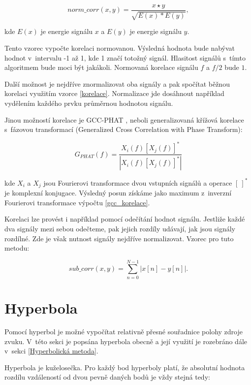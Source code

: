 \begin{equation}
norm\_corr(x,y)=\frac{x \star y}{\sqrt{E(x) * E(y)}},
	\label{norm_korelace_energie}
\end{equation}

kde $E(x)$ je energie signálu $x$ a $E(y)$ je energie signálu $y$.

Tento vzorec vypočte korelaci normovanou. Výsledná hodnota bude nabývat hodnot v~intervalu -1 až 1, kde 1 značí totožný signál. Hlasitost signálů s~tímto algoritmem bude moci být jakákoli. Normovaná korelace signálu $f$ a $f/2$ bude $1$.

Další možnost je nejdříve znormalizovat oba signály a pak spočítat běžnou korelaci využitím vzorce \ref{korelace}. Normalizace jde dosáhnout například vydělením každého prvku průměrnou hodnotou signálu.

Jinou možností korelace je GCC-PHAT \cite{gcc}, neboli generalizovaná křížová korelace s~fázovou transformací (Generalized Cross Correlation with Phase Transform):

\begin{equation}
G_{PHAT}(f)=\frac{X_i(f)[X_j(f)]^*}{|X_i(f)[X_j(f)]^*|}
	\label{gcc_korelace}
\end{equation}

kde $X_i$ a $X_j$ jsou Fourierovi transformace dvou vstupních signálů a operace $[\ ]^*$ je komplexní konjugace. Výsledný posun získáme jako maximum z~inverzní Fourierovi transformace výpočtu \ref{gcc_korelace}.

Korelaci lze provést i například pomocí odečítání hodnot signálu. Jestliže každé dva signály mezi sebou odečteme, pak jejich rozdíly udávají, jak jsou signály rozdílné. Zde je však nutnost signály nejdříve normalizovat. Vzorec pro tuto metodu:

\begin{equation}
sub\_corr(x,y)=\sum_{n=0}^{N-1} |x[n]-y[n]|.
	\label{sub_korelace}
\end{equation}

\section{Hyperbola}

Pomocí hyperbol je možné vypočítat relativně přesné souřadnice polohy zdroje zvuku. V~této sekci je popsána hyperbola obecně a její využití je rozebráno dále v~sekci \ref{Hyperbolická metoda}.

Hyperbola je kuželosečka. Pro každý bod hyperboly platí, že absolutní hodnota rozdílu vzdáleností od dvou pevně daných bodů je vždy stejná \cite{hyperbola} tedy: 

